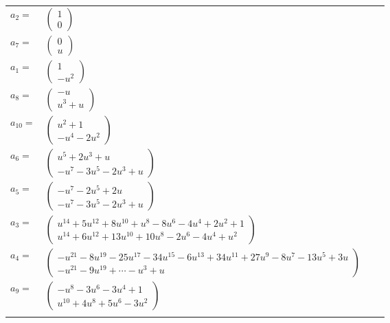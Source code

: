 \documentclass[1p]{elsarticle_modified}
\theoremstyle{definition}
\begin{document}
\begin{tabular}{m{7pt} m{180pt} m{7pt} m{180pt} }
\flushright $a_{2}=$&$\begin{pmatrix}1\\0\end{pmatrix}$ \\
\flushright $a_{7}=$&$\begin{pmatrix}0\\u\end{pmatrix}$ \\
\flushright $a_{1}=$&$\begin{pmatrix}1\\- u^2\end{pmatrix}$ \\
\flushright $a_{8}=$&$\begin{pmatrix}- u\\u^3+u\end{pmatrix}$ \\
\flushright $a_{10}=$&$\begin{pmatrix}u^2+1\\- u^4-2 u^2\end{pmatrix}$ \\
\flushright $a_{6}=$&$\begin{pmatrix}u^5+2 u^3+u\\- u^7-3 u^5-2 u^3+u\end{pmatrix}$ \\
\flushright $a_{5}=$&$\begin{pmatrix}- u^7-2 u^5+2 u\\- u^7-3 u^5-2 u^3+u\end{pmatrix}$ \\
\flushright $a_{3}=$&$\begin{pmatrix}u^{14}+5 u^{12}+8 u^{10}+u^8-8 u^6-4 u^4+2 u^2+1\\u^{14}+6 u^{12}+13 u^{10}+10 u^8-2 u^6-4 u^4+u^2\end{pmatrix}$ \\
\flushright $a_{4}=$&$\begin{pmatrix}- u^{21}-8 u^{19}-25 u^{17}-34 u^{15}-6 u^{13}+34 u^{11}+27 u^9-8 u^7-13 u^5+3 u\\- u^{21}-9 u^{19}+\cdots- u^3+u\end{pmatrix}$ \\
\flushright $a_{9}=$&$\begin{pmatrix}- u^8-3 u^6-3 u^4+1\\u^{10}+4 u^8+5 u^6-3 u^2\end{pmatrix}$\\&\end{tabular}
\end{document}
